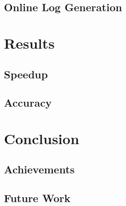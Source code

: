 \documentclass[mscthesis]{usiinfthesis}
\begin{document}
\section{Online Log Generation}

\chapter{Results}
\section{Speedup}
\section{Accuracy}

\chapter{Conclusion}
\section{Achievements}
\section{Future Work}


%
%
%
%
\end{document}
